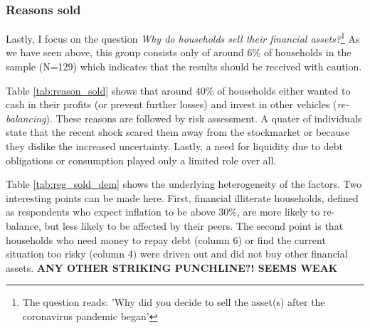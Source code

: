 \documentclass[ProjectABM]{subfiles}
\begin{document}
\subsubsection{Reasons sold}
Lastly, I focus on the question \textit{Why do households sell their financial assets?}\footnote{The question reads: 'Why did you decide to sell the asset(s) after the coronavirus pandemic began'} As we have seen above, this group consists only of around 6\% of households in the sample (N=129) which indicates that the results should be received with caution.



Table \ref{tab:reason_sold} shows that around 40\% of households either wanted to cash in their profits (or prevent further losses) and invest in other vehicles (\textit{re-balancing}). These reasons are followed by risk assessment. A quater of individuals state that the recent shock scared them away from the stockmarket or because they dislike the increased uncertainty. Lastly, a need for liquidity due to debt obligations or consumption played only a limited role over all. %



Table \ref{tab:reg_sold_dem} shows the underlying heterogeneity of the factors. Two interesting points can be made here. First, financial illiterate households, defined as respondents who expect inflation to be above 30\%, are more likely to re-balance, but less likely to be affected by their peers. The second point is that households who need money to repay debt (column 6) or find the current situation too risky (column 4) were driven out and did not buy other financial assets. \textbf{ANY OTHER STRIKING PUNCHLINE?! SEEMS WEAK} 
\end{document}
